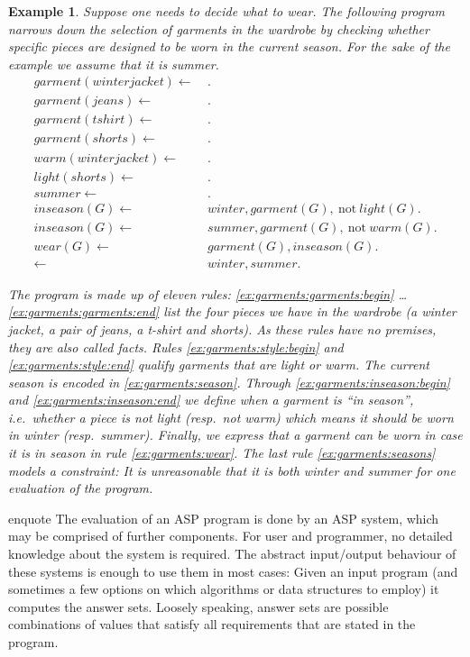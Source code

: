 \documentclass[final]{vutinfth} %
\newtheorem{example}{Example}[chapter]
\newcommand{\fail}{\mathrm{not } \ \xspace}
\newcommand{\from}{\ensuremath{\leftarrow}}
\begin{document}
\begin{example}
\label{ex:garments}
Suppose one needs to decide what to wear. The following program narrows down the selection of garments in the wardrobe by checking whether specific pieces are designed to be worn in the current season. For the sake of the example we assume that it is summer.
\begin{align}
garment(winterjacket)\from& \ .\tag{$f_1$}\label{ex:garments:garments:begin}\\
garment(jeans)\from& \ .\tag{$f_2$}\\
garment(tshirt)\from& \ .\tag{$f_3$}\\
garment(shorts)\from& \ .\tag{$f_4$}\label{ex:garments:garments:end}\\
warm(winterjacket)\from& \ .\tag{$f_5$}\label{ex:garments:style:begin}\\
light(shorts)\from& \ .\tag{$f_6$}\label{ex:garments:style:end}\\
summer\from& \ .\tag{$f_7$}\label{ex:garments:season}\\
inseason(G) \from& \ winter, garment(G),~\fail light(G). \tag{$r_1$}\label{ex:garments:inseason:begin}\\
inseason(G) \from& \ summer, garment(G),~\fail warm(G). \tag{$r_2$}\label{ex:garments:inseason:end}\\
wear(G) \from& \ garment(G), inseason(G). \tag{$r_3$}\label{ex:garments:wear}\\
\from& \ winter, summer. \tag{$c_1$}\label{ex:garments:seasons}
\end{align}

The program is made up of eleven rules: \ref{ex:garments:garments:begin} \ldots \ref{ex:garments:garments:end} list the four pieces we have in the wardrobe (a winter jacket, a pair of jeans, a t-shirt and shorts). As these rules have no premises, they are also called \emph{facts}. Rules \ref{ex:garments:style:begin} and \ref{ex:garments:style:end} qualify garments that are light or warm. The current season is encoded in \ref{ex:garments:season}. Through \ref{ex:garments:inseason:begin} and \ref{ex:garments:inseason:end} we define when a garment is \enquote{in season}, i.e.~whether a piece is not light (resp.~not warm) which means it should be worn in winter (resp.~summer). Finally, we express that a garment can be worn in case it is in season in rule \ref{ex:garments:wear}. The last rule \ref{ex:garments:seasons} models a \emph{constraint}: It is unreasonable that it is both winter and summer for one evaluation of the program.
\end{example}
enquote
The evaluation of an ASP program is done by an ASP system, which may be comprised of further components. For user and programmer, no detailed knowledge about the system is required. The abstract input/output behaviour of these systems is enough to use them in most cases: Given an input program (and sometimes a few options on which algorithms or data structures to employ) it computes the answer sets. Loosely speaking, answer sets are possible combinations of values that satisfy all requirements that are stated in the program.
\end{document}
